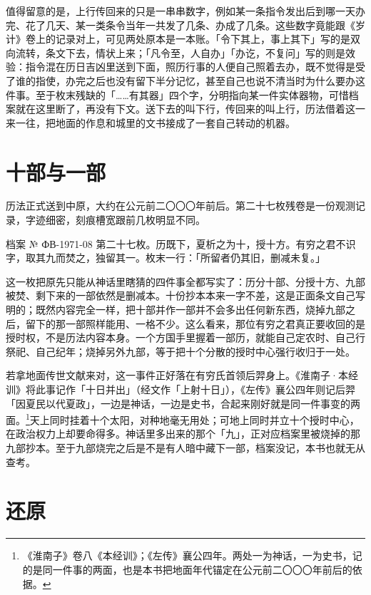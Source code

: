 值得留意的是，上行传回来的只是一串串数字，例如某一条指令发出后到哪一天办完、花了几天、某一类条令当年一共发了几条、办成了几条。这些数字竟能跟《岁计》卷上的记录对上，可见两处原本是一本账。「令下其上，事上其下」写的是双向流转，条文下去，情状上来；「凡令至，人自办」「办讫，不复问」写的则是效验：指令混在历日吉凶里送到下面，照历行事的人便自己照着去办，既不觉得是受了谁的指使，办完之后也没有留下半分记忆，甚至自己也说不清当时为什么要办这件事。至于枚末残缺的「……有其器」四个字，分明指向某一件实体器物，可惜档案就在这里断了，再没有下文。送下去的叫下行，传回来的叫上行，历法借着这一来一往，把地面的作息和城里的文书接成了一套自己转动的机器。

\section{十部与一部}

历法正式送到中原，大约在公元前二〇〇〇年前后。第二十七枚残卷是一份观测记录，字迹细密，刻痕槽宽跟前几枚明显不同。

\begin{archive}[内部参考]{档案 № ФВ-1971-08}
第二十七枚。历既下，夏析之为十，授十方。有穷之君不识字，取其九而焚之，独留其一。枚末一行：「所留者仍其旧，删减未复。」
\end{archive}

这一枚把原先只能从神话里瞎猜的四件事全都写实了：历分十部、分授十方、九部被焚、剩下来的一部依然是删减本。十份抄本本来一字不差，这是正面条文自己写明的；既然内容完全一样，把十部并作一部并不会多出任何新东西，烧掉九部之后，留下的那一部照样能用、一格不少。这么看来，那位有穷之君真正要收回的是授时权，不是历法内容本身。一个方国手里握着一部历，就能自己定农时、自己行祭祀、自己纪年；烧掉另外九部，等于把十个分散的授时中心强行收归于一处。

若拿地面传世文献来对，这一事件正好落在有穷氏首领后羿身上。《淮南子·本经训》将此事记作「十日并出」（经文作「上射十日」），《左传》襄公四年则记后羿「因夏民以代夏政」，一边是神话，一边是史书，合起来刚好就是同一件事变的两面。\footnote{《淮南子》卷八《本经训》；《左传》襄公四年。两处一为神话，一为史书，记的是同一件事的两面，也是本书把地面年代锚定在公元前二〇〇〇年前后的依据。}天上同时挂着十个太阳，对种地毫无用处；可地上同时并立十个授时中心，在政治权力上却要命得多。神话里多出来的那个「九」，正对应档案里被烧掉的那九部抄本。至于九部烧完之后是不是有人暗中藏下一部，档案没记，本书也就无从查考。

\section{还原}

